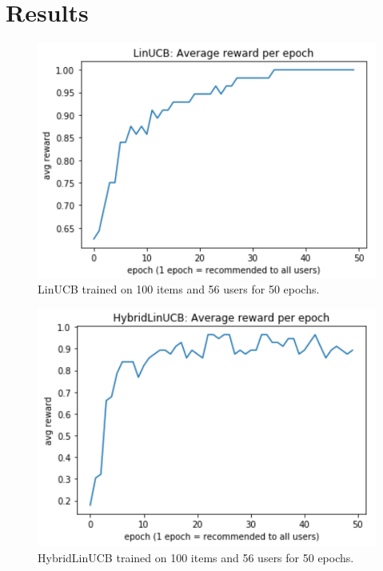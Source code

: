 \documentclass[12pt, titlepage]{article}
\begin{document}
\section{Results}\label{sec:results}

\begin{figure}[h]
 \centering
 \includegraphics[width=\columnwidth]{img/LinUCB-100items-50epochs}
 \caption{LinUCB trained on 100 items and 56 users for 50 epochs.}
 \label{fig:linUCB}
\end{figure}

\begin{figure}[h]
 \centering
 \includegraphics[width=\columnwidth]{img/HybridLinUCB-100items-50epochs}
 \caption{HybridLinUCB trained on 100 items and 56 users for 50 epochs.}
 \label{fig:linUCB}
\end{figure}
\end{document}
